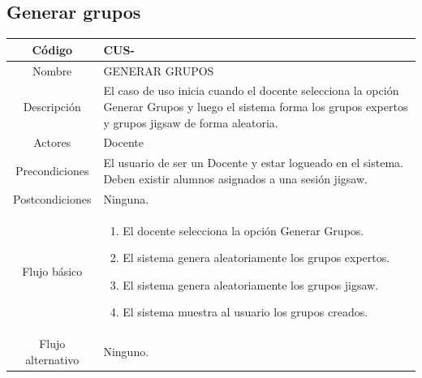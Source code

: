 \subsection{Generar grupos}
\begin{longtable}{|c|L{10cm}|}
	\toprule[0.8mm]
	Código &  CUS-\casodeuso\\  \midrule
	Nombre &  GENERAR GRUPOS\\  \midrule
	Descripción &  El caso de uso inicia cuando el docente selecciona la opción Generar Grupos y luego el sistema forma los grupos expertos y grupos jigsaw de forma aleatoria.\\  \midrule
	Actores &  Docente\\  \midrule
	Precondiciones &  El usuario de ser un Docente y estar logueado en el sistema. Deben existir alumnos asignados a una sesión jigsaw.\\  \midrule
	Postcondiciones &  Ninguna.\\  \midrule
	Flujo básico &    \begin{enumerate}
		\item El docente selecciona la opción Generar Grupos.
		\item El sistema genera aleatoriamente los grupos expertos.
		\item El sistema genera aleatoriamente los grupos jigsaw.
		\item El sistema muestra al usuario los grupos creados.
	\end{enumerate}  \\ \midrule
	Flujo alternativo & Ninguno. \\  \bottomrule[0.8mm]
\end{longtable}
\clearpage
